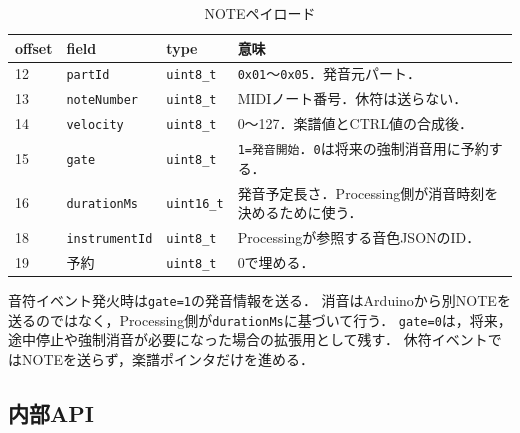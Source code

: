 \documentclass[uplatex,dvipdfmx]{jlreq}
\newcommand{\code}[1]{\texttt{#1}}
\begin{document}
\begin{table}[H]
\centering
\caption{NOTEペイロード}
\label{tab:saito-note-payload}
\begin{tabular}{p{}p{}p{}p{}}
\toprule
\textbf{offset} & \textbf{field} & \textbf{type} & \textbf{意味} \\
\midrule
12 & \code{partId} & \code{uint8\_t} & \code{0x01}〜\code{0x05}．発音元パート．\\
13 & \code{noteNumber} & \code{uint8\_t} & MIDIノート番号．休符は送らない．\\
14 & \code{velocity} & \code{uint8\_t} & 0〜127．楽譜値とCTRL値の合成後．\\
15 & \code{gate} & \code{uint8\_t} & \code{1=発音開始}．\code{0}は将来の強制消音用に予約する．\\
16 & \code{durationMs} & \code{uint16\_t} & 発音予定長さ．Processing側が消音時刻を決めるために使う．\\
18 & \code{instrumentId} & \code{uint8\_t} & Processingが参照する音色JSONのID．\\
19 & 予約 & \code{uint8\_t} & 0で埋める．\\
\bottomrule
\end{tabular}
\end{table}

音符イベント発火時は\code{gate=1}の発音情報を送る．
消音はArduinoから別NOTEを送るのではなく，Processing側が\code{durationMs}に基づいて行う．
\code{gate=0}は，将来，途中停止や強制消音が必要になった場合の拡張用として残す．
休符イベントではNOTEを送らず，楽譜ポインタだけを進める．

\subsection{内部API}
\end{document}
